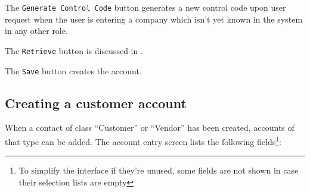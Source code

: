The \texttt{Generate Control Code} button generates a new control code upon
user request when the user is entering a company which isn't yet known
in the system in any other role.

The \texttt{Retrieve} button is discussed in .

The \texttt{Save} button creates the account.

\subsection{Creating a customer account}
\label{subsec-workflows-customers-creating-account}

When a contact of class ``Customer'' or ``Vendor'' has been created,
accounts of that type can be added. The account entry screen lists the
following fields\footnote{To simplify the interface if they're unused, some fields
are not shown in case their selection lists are empty}:

